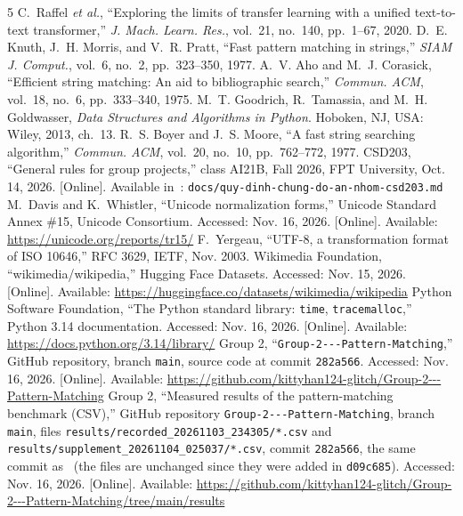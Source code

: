 \documentclass[conference]{IEEEtran}
\begin{document}
\begin{thebibliography}{5}
 C.~Raffel \emph{et al.}, ``Exploring the limits of transfer learning with a unified text-to-text transformer,'' \emph{J. Mach. Learn. Res.}, vol.~21, no.~140, pp.~1--67, 2020.
 D.~E. Knuth, J.~H. Morris, and V.~R. Pratt, ``Fast pattern matching in strings,'' \emph{SIAM J. Comput.}, vol.~6, no.~2, pp.~323--350, 1977.
 A.~V. Aho and M.~J. Corasick, ``Efficient string matching: An aid to bibliographic search,'' \emph{Commun. ACM}, vol.~18, no.~6, pp.~333--340, 1975.
 M.~T. Goodrich, R.~Tamassia, and M.~H. Goldwasser, \emph{Data Structures and Algorithms in Python}. Hoboken, NJ, USA: Wiley, 2013, ch.~13.
 R.~S. Boyer and J.~S. Moore, ``A fast string searching algorithm,'' \emph{Commun. ACM}, vol.~20, no.~10, pp.~762--772, 1977.
 CSD203, ``General rules for group projects,'' class AI21B, Fall 2026, FPT University, Oct. 14, 2026. [Online]. Available in~\cite{repo}: \nolinkurl{docs/quy-dinh-chung-do-an-nhom-csd203.md}
 M.~Davis and K.~Whistler, ``Unicode normalization forms,'' Unicode Standard Annex \#15, Unicode Consortium. Accessed: Nov. 16, 2026. [Online]. Available: \url{https://unicode.org/reports/tr15/}
 F.~Yergeau, ``UTF-8, a transformation format of ISO 10646,'' RFC 3629, IETF, Nov. 2003.
 Wikimedia Foundation, ``wikimedia/wikipedia,'' Hugging Face Datasets. Accessed: Nov. 15, 2026. [Online]. Available: \url{https://huggingface.co/datasets/wikimedia/wikipedia}
 Python Software Foundation, ``The Python standard library: \texttt{time}, \texttt{tracemalloc},'' Python 3.14 documentation. Accessed: Nov. 16, 2026. [Online]. Available: \url{https://docs.python.org/3.14/library/}
 Group 2, ``\texttt{Group-2-{}-{}-Pattern-Matching},'' GitHub repository, branch \texttt{main}, source code at commit \texttt{282a566}. Accessed: Nov. 16, 2026. [Online]. Available: \url{https://github.com/kittyhan124-glitch/Group-2---Pattern-Matching}
 Group 2, ``Measured results of the pattern-matching benchmark (CSV),'' GitHub repository \texttt{Group-2-{}-{}-Pattern-Matching}, branch \texttt{main}, files \texttt{results/recorded\_20261103\_234305/*.csv} and \texttt{results/supplement\_20261104\_025037/*.csv}, commit \texttt{282a566}, the same commit as~\cite{repo} (the files are unchanged since they were added in \texttt{d09c685}). Accessed: Nov. 16, 2026. [Online]. Available: \url{https://github.com/kittyhan124-glitch/Group-2---Pattern-Matching/tree/main/results}
\end{thebibliography}
\end{document}
